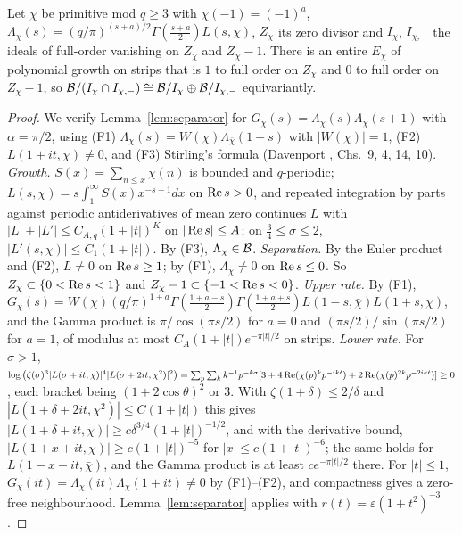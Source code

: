 \begin{proposition}\label{prop:separatorL}
Let $\chi$ be primitive mod $q\ge3$ with $\chi(-1)=(-1)^a$, $\Lambda_\chi(s)=(q/\pi)^{(s+a)/2}\Gamma(\tfrac{s+a}2)L(s,\chi)$, $Z_\chi$ its zero divisor and $I_\chi$, $I_{\chi,-}$ the ideals of full-order vanishing on $Z_\chi$ and $Z_\chi-1$. There is an entire $E_\chi$ of polynomial growth on strips that is $1$ to full order on $Z_\chi$ and $0$ to full order on $Z_\chi-1$, so $\mathcal{B}/(I_\chi\cap I_{\chi,-})\cong\mathcal{B}/I_\chi\oplus\mathcal{B}/I_{\chi,-}$ equivariantly.
\end{proposition}

\begin{proof}
We verify Lemma~\ref{lem:separator} for $G_\chi(s)=\Lambda_\chi(s)\Lambda_\chi(s+1)$ with $\alpha=\pi/2$, using (F1) $\Lambda_\chi(s)=W(\chi)\Lambda_{\bar\chi}(1-s)$ with $|W(\chi)|=1$, (F2) $L(1+it,\chi)\ne0$, and (F3) Stirling's formula (Davenport \cite{Davenport}, Chs.~9, 4, 14, 10).
\emph{Growth.} $S(x)=\sum_{n\le x}\chi(n)$ is bounded and $q$-periodic; $L(s,\chi)=s\int_1^\infty S(x)x^{-s-1}dx$ on $\operatorname{Re} s>0$, and repeated integration by parts against periodic antiderivatives of mean zero continues $L$ with $|L|+|L'|\le C_{A,q}(1+|t|)^K$ on $|\operatorname{Re} s|\le A$; on $\tfrac34\le\sigma\le2$, $|L'(s,\chi)|\le C_1(1+|t|)$. By (F3), $\Lambda_\chi\in\mathcal{B}$.
\emph{Separation.} By the Euler product and (F2), $L\ne0$ on $\operatorname{Re} s\ge1$; by (F1), $\Lambda_\chi\ne0$ on $\operatorname{Re} s\le0$. So $Z_\chi\subset\{0<\operatorname{Re} s<1\}$ and $Z_\chi-1\subset\{-1<\operatorname{Re} s<0\}$.
\emph{Upper rate.} By (F1), $G_\chi(s)=W(\chi)(q/\pi)^{1+a}\Gamma(\tfrac{1+a-s}2)\Gamma(\tfrac{1+a+s}2)L(1-s,\bar\chi)L(1+s,\chi)$, and the Gamma product is $\pi/\cos(\pi s/2)$ for $a=0$ and $(\pi s/2)/\sin(\pi s/2)$ for $a=1$, of modulus at most $C_A(1+|t|)e^{-\pi|t|/2}$ on strips.
\emph{Lower rate.} For $\sigma>1$, $\log\big(\zeta(\sigma)^3|L(\sigma+it,\chi)|^4|L(\sigma+2it,\chi^2)|^2\big)=\sum_p\sum_kk^{-1}p^{-k\sigma}[3+4\operatorname{Re}(\chi(p)^kp^{-ikt})+2\operatorname{Re}(\chi(p)^{2k}p^{-2ikt})]\ge0$, each bracket being $(1+2\cos\theta)^2$ or $3$. With $\zeta(1+\delta)\le2/\delta$ and $|L(1+\delta+2it,\chi^2)|\le C(1+|t|)$ this gives $|L(1+\delta+it,\chi)|\ge c\delta^{3/4}(1+|t|)^{-1/2}$, and with the derivative bound, $|L(1+x+it,\chi)|\ge c(1+|t|)^{-5}$ for $|x|\le c(1+|t|)^{-6}$; the same holds for $L(1-x-it,\bar\chi)$, and the Gamma product is at least $ce^{-\pi|t|/2}$ there. For $|t|\le1$, $G_\chi(it)=\Lambda_\chi(it)\Lambda_\chi(1+it)\ne0$ by (F1)--(F2), and compactness gives a zero-free neighbourhood. Lemma~\ref{lem:separator} applies with $r(t)=\varepsilon(1+t^2)^{-3}$.
\end{proof}

